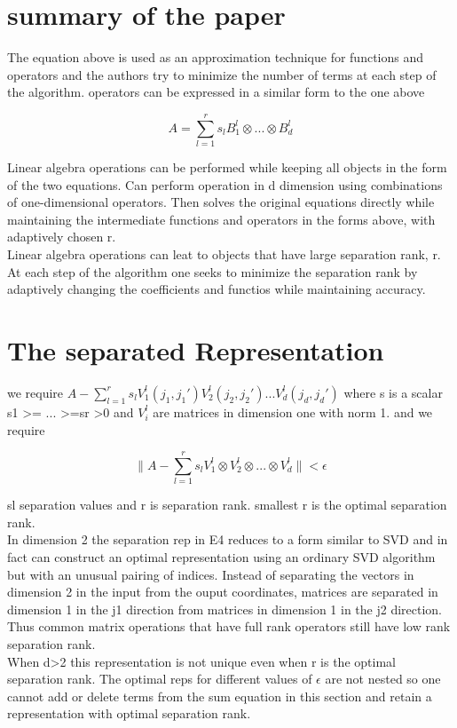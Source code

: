\documentclass[10pt, draft]{article}
\begin{document}
 \section{summary of the paper}
 The equation above is used as an approximation technique for functions and operators and the authors try to minimize the number of terms at each step of the algorithm.  operators can be expressed in a similar form to the one above 
 
 \[ A = \sum_{l=1}^r s_l B^l_1 \otimes ... \otimes B_d^l\]
 
 Linear algebra operations can be performed while keeping all objects in the form of the two equations.  Can perform operation in d dimension using combinations of one-dimensional operators.  Then solves the original equations directly while maintaining the intermediate functions and operators in the forms above, with adaptively chosen r.  \\
Linear algebra operations can leat to objects that have large separation rank, r.  At each step of the algorithm one seeks to minimize the separation rank by adaptively changing the coefficients and functios while maintaining accuracy.  \\

 
\section{The separated Representation}
we require $A - \sum_{l=1}^r s_l V_1^l(j_1, j_1')V_2^l(j_2, j_2') ... V_d^l(j_d, j_d')$ where s is a scalar s1 >= ... >=sr >0 and $V_i^l$ are matrices in dimension one with norm 1. and we require 

\[ \| A - \sum_{l=1}^r s_l V_1^l \otimes V_2^l \otimes ... \otimes V_d^l \| < \epsilon\]

sl separation values and r is separation rank. smallest r is the optimal separation rank.\\
In dimension 2 the separation rep in E4 reduces to a form similar to SVD and in fact can construct an optimal representation using an ordinary SVD algorithm but with an unusual pairing of indices.  Instead of separating the vectors in dimension 2 in the input from the ouput coordinates, matrices are separated in dimension 1 in the j1 direction from matrices in dimension 1 in the j2 direction.  Thus common matrix operations that have full rank operators still have low rank separation rank.  \\
When d>2 this representation is not unique even when r is the optimal separation rank.  The optimal reps for different values of $\epsilon$ are not nested so one cannot add or delete terms from the sum equation in this section and retain a representation with optimal separation rank. \linebreak[1]
\end{document}

